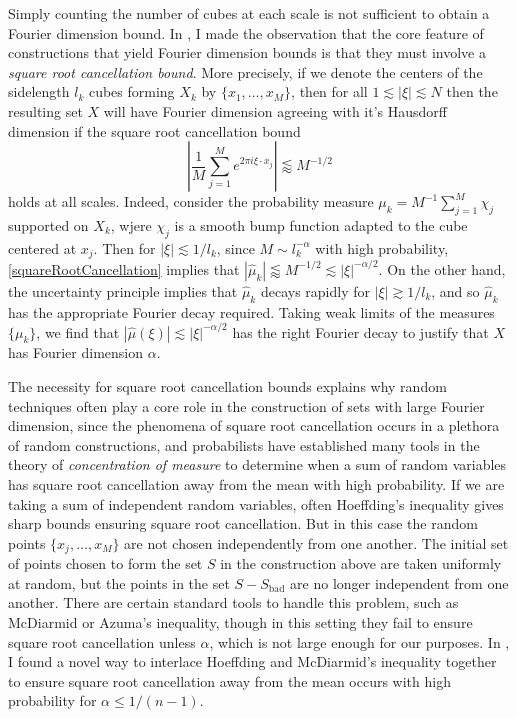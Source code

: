 \documentclass[11pt]{article}
\begin{document}
Simply counting the number of cubes at each scale is not sufficient to obtain a Fourier dimension bound. In \cite{DensonFourier}, I made the observation that the core feature of constructions that yield Fourier dimension bounds is that they must involve a \emph{square root cancellation bound}. More precisely, if we denote the centers of the sidelength $l_k$ cubes forming $X_k$ by $\{ x_1,\dots,x_M \}$, then for all $1 \lesssim |\xi| \lesssim N$ then the resulting set $X$ will have Fourier dimension agreeing with it's Hausdorff dimension if the square root cancellation bound
%
\begin{equation} \label{squareRootCancellation}
	\left| \frac{1}{M} \sum_{j = 1}^M e^{2 \pi i \xi \cdot x_j} \right| \lessapprox M^{-1/2}
\end{equation}
%
holds at all scales. Indeed, consider the probability measure $\mu_k = M^{-1} \sum_{j = 1}^M \chi_j$ supported on $X_k$, wjere $\chi_j$ is a smooth bump function adapted to the cube centered at $x_j$. Then for $|\xi| \lesssim 1/l_k$, since $M \sim l_k^{-\alpha}$ with high probability, \eqref{squareRootCancellation} implies that $|\widehat{\mu}_k| \lessapprox M^{-1/2} \lesssim |\xi|^{-\alpha/2}$. On the other hand, the uncertainty principle implies that $\widehat{\mu}_k$ decays rapidly for $|\xi| \gtrsim 1/l_k$, and so $\widehat{\mu}_k$ has the appropriate Fourier decay required. Taking weak limits of the measures $\{ \mu_k \}$, we find that $|\widehat{\mu}(\xi)| \lesssim |\xi|^{-\alpha/2}$ has the right Fourier decay to justify that $X$ has Fourier dimension $\alpha$.

The necessity for square root cancellation bounds explains why random techniques often play a core role in the construction of sets with large Fourier dimension, since the phenomena of square root cancellation occurs in a plethora of random constructions, and probabilists have established many tools in the theory of \emph{concentration of measure} to determine when a sum of random variables has square root cancellation away from the mean with high probability. If we are taking a sum of independent random variables, often Hoeffding's inequality gives sharp bounds ensuring square root cancellation. But in this case the random points $\{ x_j, \dots, x_M \}$ are not chosen independently from one another. The initial set of points chosen to form the set $S$ in the construction above are taken uniformly at random, but the points in the set $S - S_{\text{bad}}$ are no longer independent from one another. There are certain standard tools to handle this problem, such as McDiarmid or Azuma's inequality, though in this setting they fail to ensure square root cancellation unless $\alpha$, which is not large enough for our purposes. In \cite{DensonFourier}, I found a novel way to interlace Hoeffding and McDiarmid's inequality together to ensure square root cancellation away from the mean occurs with high probability for $\alpha \leq 1/(n-1)$.
\end{document}
